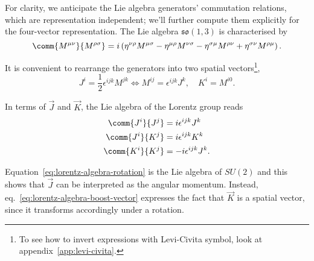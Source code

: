 For clarity, we anticipate the Lie algebra generators' commutation relations, which are representation independent; we'll further compute them explicitly for the four-vector representation. The Lie algebra $\mathfrak{so}(1,3)$ is characterised by
\begin{equation}\label{eq:lorentz-algebra-relations}
    \comm{M^{\mu\nu}}{M^{\rho\sigma}} = i \left( \eta^{\nu\rho} M^{\mu\sigma} - \eta^{\mu\rho} M^{\nu\sigma} - \eta^{\sigma\mu} M^{\rho\nu} + \eta^{\sigma\nu} M^{\rho\mu} \right).
\end{equation}

It is convenient to rearrange the generators into two spatial vectors\footnote{To see how to invert expressions with Levi-Civita symbol, look at appendix~\ref{app:levi-civita}.},
\begin{equation}\label{eq:redef-lorentz-gen}
    J^i = \frac{1}{2} \epsilon^{ijk} M^{jk} \iff M^{ij} = \epsilon^{ijk} J^k, \quad K^i = M^{i0} .
\end{equation}

In terms of $\vec{J}$ and $\vec{K}$, the Lie algebra of the Lorentz group reads
\begin{subequations}
\begin{align}
    \comm{J^i}{J^j} &= i \epsilon^{ijk} J^k \label{eq:lorentz-algebra-rotation} \\ 
    \comm{J^i}{K^j} &= i \epsilon^{ijk} K^k \label{eq:lorentz-algebra-boost-vector} \\ 
    \comm{K^i}{K^j} &= -i \epsilon^{ijk} J^k .
\end{align}
\end{subequations}

Equation~\eqref{eq:lorentz-algebra-rotation} is the Lie algebra of $SU(2)$ and this shows that $\vec{J}$ can be interpreted as the angular momentum. Instead, eq.~\eqref{eq:lorentz-algebra-boost-vector} expresses the fact that $\vec{K}$ is a spatial vector, since it transforms accordingly under a rotation. 

